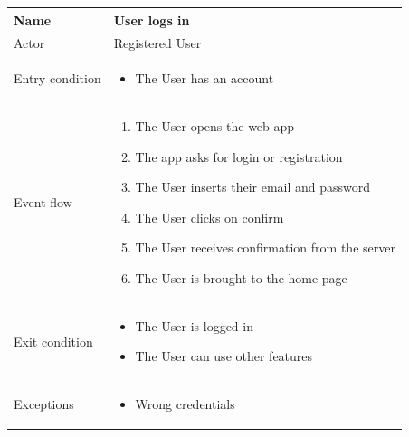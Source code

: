 \begin{table}[H]
    \begin{tabularx}{\textwidth}{|X|p{}|}
    \hline
    Name           & User logs in   \\ \hline
    Actor          & Registered User \\ \hline
    Entry condition & \begin{itemize}
        \item The User has an account
    \end{itemize}\\ \hline
    Event flow     & \begin{enumerate}
        \item The User opens the web app
        \item The app asks for login or registration
        \item The User inserts their email and password
        \item The User clicks on confirm
        \item The User receives confirmation from the server
        \item The User is brought to the home page
    \end{enumerate} \\ \hline
    Exit condition & \begin{itemize}
        \item The User is logged in
        \item The User can use other features
    \end{itemize}\\ \hline
    Exceptions & \begin{itemize}
        \item Wrong credentials
    \end{itemize} \\ \hline
    \end{tabularx}
\end{table}

